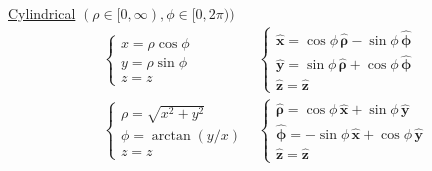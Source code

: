 \underline{Cylindrical}  $(\rho \in [0, \infty), \phi \in [0, 2\pi))$
\begin{align*}
&\begin{cases} 
x = \rho\cos\phi \\ 
y = \rho\sin\phi \\ 
z = z 
\end{cases} & 
\begin{cases} 
\mathbf{\hat{x}} = \cos\phi\,\bm{\hat{\rho}} - \sin\phi\,\bm{\hat{\phi}} \\ 
\mathbf{\hat{y}} = \sin\phi\,\bm{\hat{\rho}} + \cos\phi\,\bm{\hat{\phi}} \ \ \
\\ 
\mathbf{\hat{z}} = \mathbf{\hat{z}} 
\end{cases}
\\[0pt]
&\begin{cases} 
\rho = \sqrt{x^2+y^2} \\ 
\phi = \arctan(y/x) \\ 
z = z 
\end{cases}
&
\begin{cases} 
\bm{\hat{\rho}} = \cos\phi\,\mathbf{\hat{x}} + \sin\phi\,\mathbf{\hat{y}} \\ 
\bm{\hat{\phi}} = -\sin\phi\,\mathbf{\hat{x}} + \cos\phi\,\mathbf{\hat{y}} \\ 
\mathbf{\hat{z}} = \mathbf{\hat{z}} 
\end{cases}
\end{align*}
